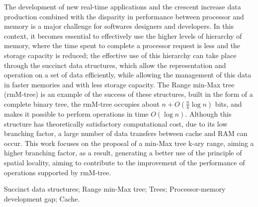 The development of new real-time applications and the crescent increase data production combined with the disparity in performance between  processor and memory is a major challenge for softwares designers and developers. In this context, it becomes essential to effectively use the higher levels of hierarchy of memory, where the time spent to complete a processor  request is less and the storage capacity is reduced;  the effective use of this hierarchy can take place through the succinct data structures, which allow the representation and operation on a set of data efficiently,  while allowing the management of this data in faster memories and with  less storage capacity. The Range min-Max tree (rmM-tree) is an example of the success of these structures, built in the form of a complete binary tree, the rmM-tree occupies  about $n + O (\frac {n} {b} \log n)$ bits, and makes it possible to perform operations in time $O(\log n)$.  Although this structure has theoretically satisfactory computational cost, due to its low branching factor, a large number of data transfers between  cache and RAM can occur. This work focuses on the proposal of a min-Max tree k-ary range, aiming a higher branching factor, as a result, generating a better use of the principle of spatial locality, aiming to contribute to the improvement of the performance of operations supported by rmM-tree.

\begin{keywords}
Succinct data structures; Range min-Max tree; Trees; Processor-memory development gap; Cache.
\end{keywords}